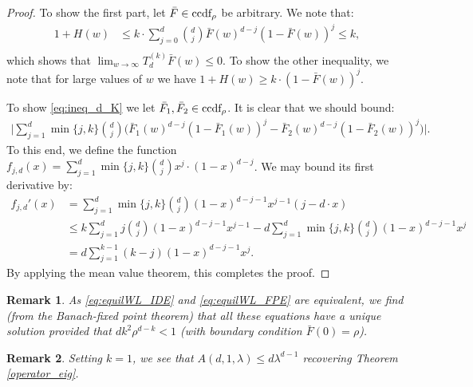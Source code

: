 \documentclass[12pt]{report}
\newtheorem{remark}{Remark}
\begin{document}
\begin{proof}

To show the first part, let $\bar F \in \textup{ccdf}_{\rho}$ be arbitrary. We note that:
\begin{align*}
1+H(w) &\leq k \cdot \sum_{j=0}^d \binom{d}{j} \bar F(w)^{d-j} (1-\bar F(w))^j \leq k, \\
\end{align*}
which shows that $\lim_{w\rightarrow \infty} T_d^{(k)} \bar F(w) \leq 0$. To show the other inequality, we note that for large values of $w$ we have $1+H(w) \geq k \cdot (1-\bar F(w))^j$.

To show \eqref{eq:ineq_d_K} we let $\bar F_1, \bar F_2 \in \textup{ccdf}_{\rho}$. It is clear that we should bound:
\begin{align*}
\bigg| \sum_{j=1}^d \min\{j,k\} \binom{d}{j} \bigg( \bar F_1(w)^{d-j} (1-\bar F_1(w))^j - \bar F_2(w)^{d-j} (1-\bar F_2(w))^j \bigg)\bigg|.
\end{align*}
To this end, we define the function $f_{j,d}(x) = \sum_{j=1}^d \min\{j,k\} \binom{d}{j} x^j \cdot (1-x)^{d-j}$. We may bound its first derivative by:
\begin{align*}
f_{j,d}'(x)
&= \sum_{j=1}^d \min\{j,k\} \binom{d}{j} (1-x)^{d-j-1} x^{j-1} (j-d\cdot x)\\
&\leq k \sum_{j=1}^d j \binom{d}{j} (1-x)^{d-j-1} x^{j-1} - d \sum_{j=1}^d \min\{j,k\} \binom{d}{j} (1-x)^{d-j-1} x^j\\
&= d \sum_{j=1}^{k-1} (k-j) (1-x)^{d-j-1} x^j.
\end{align*}
By applying the mean value theorem, this completes the proof.
\end{proof}
\begin{remark}
As \eqref{eq:equilWL_IDE} and \eqref{eq:equilWL_FPE} are equivalent, we find (from the Banach-fixed point theorem) that all these equations have a unique solution provided that $dk^2\rho^{d-k} <1$ (with boundary condition $\bar F(0) = \rho$).
\end{remark}
\begin{remark}
	Setting $k=1$, we see that $A(d,1,\lambda) \leq d \lambda^{d-1}$ recovering Theorem \ref{operator_eig}.
\end{remark}
\end{document}
